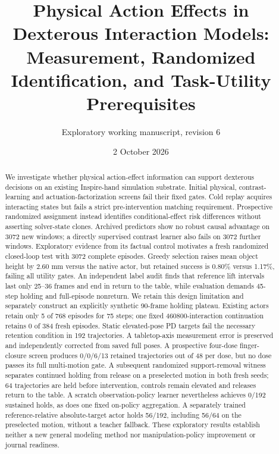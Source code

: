 \documentclass[10 pt]{article}
\title{Physical Action Effects in Dexterous Interaction Models:\\Measurement, Randomized Identification, and Task-Utility Prerequisites}
\author{Exploratory working manuscript, revision 6}
\date{2 October 2026}
\begin{document}
\maketitle
\begin{abstract}
We investigate whether physical action-effect information can support dexterous
decisions on an existing Inspire-hand simulation substrate. Initial physical,
contrast-learning and actuation-factorization screens fail their fixed gates.
Cold replay acquires interacting states but fails a strict pre-intervention
matching requirement. Prospective randomized assignment instead identifies
conditional-effect risk differences without asserting solver-state clones.
Archived predictors show no robust causal advantage on 3072 new windows; a
directly supervised contrast learner also fails on 3072 further windows.
Exploratory evidence from its factual control motivates a fresh randomized
closed-loop test with 3072 complete episodes. Greedy selection raises mean
object height by 2.60 mm versus the native actor, but retained success is
0.80\% versus 1.17\%, failing all utility gates. An independent label audit
finds that reference lift intervals last only 25--36 frames and end in return
to the table, while evaluation demands 45-step holding and full-episode nonreturn.
We retain this design limitation and separately construct an explicitly synthetic
90-frame holding plateau. Existing actors retain only 5 of 768 episodes for
75 steps; one fixed 460800-interaction continuation retains 0 of 384 fresh episodes.
Static elevated-pose PD targets fail the necessary retention condition in 192
trajectories. A tabletop-axis measurement error is preserved and independently
corrected from saved full poses. A prospective four-dose finger-closure screen
produces 0/0/6/13 retained trajectories out of 48 per dose, but no dose passes
its full multi-motion gate. A subsequent randomized support-removal witness separates
continued holding from release on a preselected motion in both fresh seeds;
64 trajectories are held before intervention, controls remain elevated and releases
return to the table. A scratch observation-policy learner nevertheless achieves
0/192 sustained holds, as does one fixed on-policy aggregation. A separately
trained reference-relative absolute-target actor holds 56/192, including 56/64
on the preselected motion, without a teacher fallback. These exploratory results establish neither a new general
modeling method nor manipulation-policy improvement or journal readiness.
\end{abstract}
\end{document}
